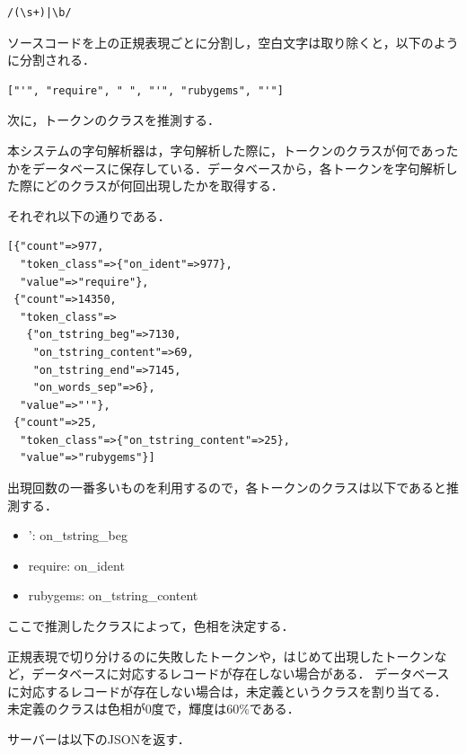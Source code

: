 \documentclass{cs-thesis}
\begin{document}
\begin{framed}
\begin{verbatim}
/(\s+)|\b/
\end{verbatim}
\end{framed}

ソースコードを上の正規表現ごとに分割し，空白文字は取り除くと，以下のように分割される．

\begin{framed}
\begin{verbatim}
["'", "require", " ", "'", "rubygems", "'"]
\end{verbatim}
\end{framed}

次に，トークンのクラスを推測する．

本システムの字句解析器は，字句解析した際に，トークンのクラスが何であったかをデータベースに保存している．データベースから，各トークンを字句解析した際にどのクラスが何回出現したかを取得する．

それぞれ以下の通りである．

\begin{framed}
\begin{verbatim}
[{"count"=>977,
  "token_class"=>{"on_ident"=>977},
  "value"=>"require"},
 {"count"=>14350,
  "token_class"=>
   {"on_tstring_beg"=>7130,
    "on_tstring_content"=>69,
    "on_tstring_end"=>7145,
    "on_words_sep"=>6},
  "value"=>"'"},
 {"count"=>25,
  "token_class"=>{"on_tstring_content"=>25},
  "value"=>"rubygems"}]
\end{verbatim}
\end{framed}

出現回数の一番多いものを利用するので，各トークンのクラスは以下であると推測する．

\begin{itemize}
 \item ': on\_tstring\_beg
 \item require: on\_ident
 \item rubygems: on\_tstring\_content
\end{itemize}

ここで推測したクラスによって，色相を決定する．

正規表現で切り分けるのに失敗したトークンや，はじめて出現したトークンなど，データベースに対応するレコードが存在しない場合がある．
データベースに対応するレコードが存在しない場合は，未定義というクラスを割り当てる．
未定義のクラスは色相が0度で，輝度は60\%である．

サーバーは以下のJSONを返す．
\end{document}
